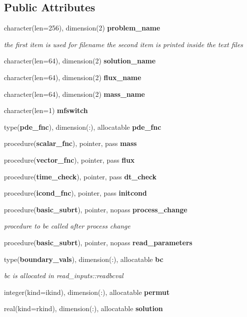 \subsection*{Public Attributes}
\begin{DoxyCompactItemize}
\item 
character(len=256), dimension(2) {\bf problem\+\_\+name}
\begin{DoxyCompactList}\small\item\em the first item is used for filename the second item is printed inside the text files \end{DoxyCompactList}\item 
character(len=64), dimension(2) {\bf solution\+\_\+name}
\item 
character(len=64), dimension(2) {\bf flux\+\_\+name}
\item 
character(len=64), dimension(2) {\bf mass\+\_\+name}
\item 
character(len=1) {\bf mfswitch}
\item 
type({\bf pde\+\_\+fnc}), dimension(\+:), allocatable {\bf pde\+\_\+fnc}
\item 
procedure({\bf scalar\+\_\+fnc}), pointer, pass {\bf mass}
\item 
procedure({\bf vector\+\_\+fnc}), pointer, pass {\bf flux}
\item 
procedure({\bf time\+\_\+check}), pointer, pass {\bf dt\+\_\+check}
\item 
procedure({\bf icond\+\_\+fnc}), pointer, pass {\bf initcond}
\item 
procedure({\bf basic\+\_\+subrt}), pointer, nopass {\bf process\+\_\+change}
\begin{DoxyCompactList}\small\item\em procedure to be called after process change \end{DoxyCompactList}\item 
procedure({\bf basic\+\_\+subrt}), pointer, nopass {\bf read\+\_\+parameters}
\item 
type({\bf boundary\+\_\+vals}), dimension(\+:), allocatable {\bf bc}
\begin{DoxyCompactList}\small\item\em bc is allocated in read\+\_\+inputs\+::readbcval \end{DoxyCompactList}\item 
integer(kind=ikind), dimension(\+:), allocatable {\bf permut}
\item 
real(kind=rkind), dimension(\+:), allocatable {\bf solution}
\item 

\end{DoxyCompactItemize}
